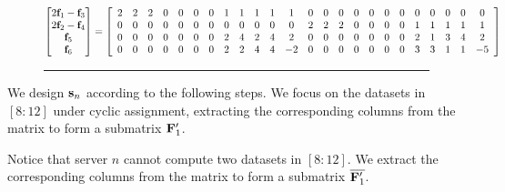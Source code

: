 \documentclass[conference,letterpaper]{IEEEtran}
\begin{document}
\begin{example}
\begin{figure}
\begin{equation} \label{eq:scheme 3 transmission of first class}
\begin{aligned}
\begin{bmatrix}
 2{{\bf f}}_1 - {{\bf f}}_3 \\ 
 2{{\bf f}}_2 - {{\bf f}}_4 \\ 
 {{\bf f}}_5 \\ 
 {{\bf f}}_6 
\end{bmatrix} = 
 \left[
\begin{array}{cccccccccccccccccccccccc}
 2 & 2 & 2 & 0 & 0 & 0 & 0 & 1 & 1 & 1 & 1 & 1 & 0 & 0 & 0 & 0 & 0 & 0 & 0 & 0 & 0 & 0 & 0 & 0 \\
 0 & 0 & 0 & 0 & 0 & 0 & 0 & 0 & 0 & 0 & 0 & 0 & 2 & 2 & 2 & 0 & 0 & 0 & 0 & 1 & 1 & 1 & 1 & 1 \\
 0 & 0 & 0 & 0 & 0 & 0 & 0 & 2 & 4 & 2 & 4 & 2 & 0 & 0 & 0 & 0 & 0 & 0 & 0 & 2 & 1 & 3 & 4 & 2 \\
 0 & 0 & 0 & 0 & 0 & 0 & 0 & 2 & 2 & 4 & 4 & -2 & 0 & 0 & 0 & 0 & 0 & 0 & 0 & 3 & 3 & 1 & 1 & -5
\end{array}
 \right]
\end{aligned}
\end{equation}
\rule{\textwidth}{0.2pt} %
\end{figure}
\fi


We design ${\bf s}_n$ according to the following steps. We focus on the datasets in $[8:12]$ under cyclic assignment, extracting the corresponding columns from the matrix to form a submatrix ${\bf F}^{\prime}_1$. 

Notice that server $n$ cannot compute two datasets in $[8:12]$. We extract the corresponding columns from the matrix to form a submatrix $\overline{{\bf F}^{\prime}_1}$.


\end{example}
\end{document}
